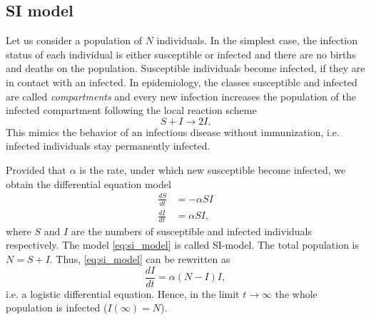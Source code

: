 \documentclass[openright,twoside,headsepline]{scrbook}
\begin{document}
\subsection{SI model}\label{sec:si_model}
Let us consider a population of $N$ individuals.
In the simplest case, the infection status of each individual is either susceptible or infected and there are no births and deaths on the population.
Susceptible individuals become infected, if they are in contact with an infected.
In epidemiology, the classes susceptible and infected are called \emph{compartments} and every new infection increases the population of the infected compartment following the local reaction scheme
\[
S+I \rightarrow 2 I.
\]
This mimics the behavior of an infectious disease without immunization, i.e. infected individuals stay permanently infected.

Provided that $\alpha $ is the rate, under which new susceptible become infected, we obtain the differential equation model
\begin{align}\label{eq:si_model}
\frac{dS}{dt} &= -\alpha SI \nonumber \\
\frac{dI}{dt} &= \alpha SI,
\end{align}
where $S$ and $I$ are the numbers of susceptible and infected individuals respectively.
The model \eqref{eq:si_model} is called SI-model.
The total population is $N=S+I$.
Thus, \eqref{eq:si_model} can be rewritten as
\[
\frac{dI}{dt}=\alpha (N-I)I,
\]
i.e. a logistic differential equation.
Hence, in the limit $t\rightarrow \infty $ the whole population is infected ($I(\infty )=N$). 
\end{document}
